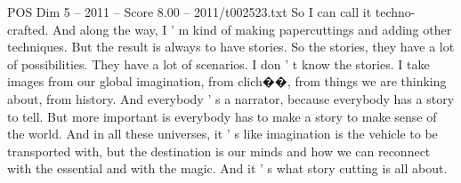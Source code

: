 \begin{textsample}{POS Dim 5 – 2011 – Score 8.00 – 2011/t002523.txt}
So I can call it techno-crafted.
And along the way, I ' m kind of making papercuttings and adding other techniques.
But the result is always to have stories.
So the stories, they have a lot of possibilities.
They have a lot of scenarios.
I don ' t know the stories.
I take images from our global imagination, from clich{\EmojiFont �}{\EmojiFont �}, from things we are thinking about, from history.
And everybody ' s a narrator, because everybody has a story to tell.
But more important is everybody has to make a story to make sense of the world.
And in all these universes, it ' s like imagination is the vehicle to be transported with, but the destination is our minds and how we can reconnect with the essential and with the magic.
And it ' s what story cutting is all about.

\end{textsample}
